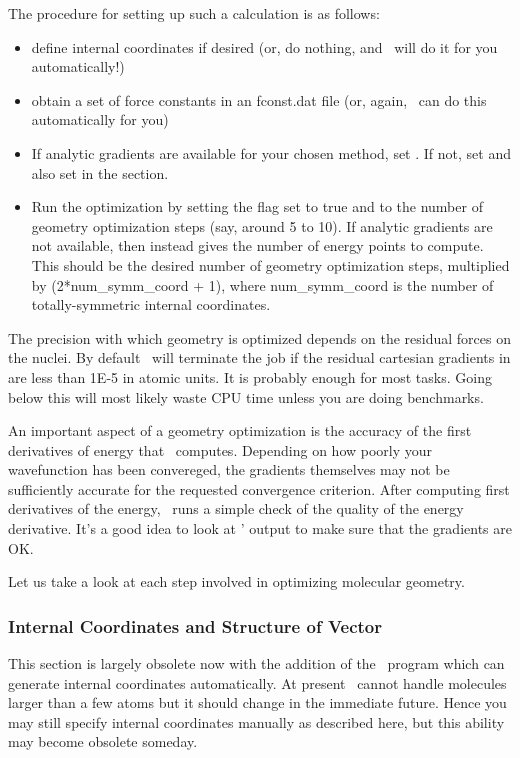 The procedure for setting up such a calculation is as follows: 
\begin{itemize}
\item define internal coordinates if desired (or, do nothing, and
      \PSIoptking\ will do it for you automatically!)
\item obtain a set of force constants in an fconst.dat file (or,
      again, \PSIoptking\ can do this automatically for you)
\item If analytic gradients are available for your chosen method, set
      .  If not, set  and
      also set  in the
       section.
\item Run the optimization by setting the  flag set to true 
      and  to the number of geometry optimization
      steps (say, around 5 to 10).  If analytic gradients are not
      available, then  instead gives the number of energy
      points to compute.  This should be the desired number of 
      geometry optimization steps, multiplied by (2*num\_symm\_coord + 1),
      where num\_symm\_coord is the number of totally-symmetric internal
      coordinates.
\end{itemize}
The precision with which geometry is optimized depends on the residual
forces on the nuclei. By default \PSIoptking\ will terminate the job
if the residual cartesian gradients in  are less than
1E-5 in atomic units. It is probably enough for most
tasks. Going below this will most likely waste CPU
time unless you are doing benchmarks.

An important aspect of a geometry optimization is the accuracy of the
first derivatives of energy that \PSIthree\ computes.  Depending on
how poorly your wavefunction has been convereged, the gradients
themselves may not be sufficiently accurate for the requested
convergence criterion. After computing first derivatives of the
energy, \PSIcints\ runs a simple check of the quality of the energy
derivative. It's a good idea to look at \PSIcints ' output to make
sure that the gradients are OK.

Let us take a look at each step involved in optimizing molecular geometry.

\subsubsection{Internal Coordinates and Structure of  Vector}
This section is largely obsolete now with the addition of the \PSIoptking\ 
program which can generate internal coordinates automatically. At present
\PSIoptking\ cannot handle molecules larger than a few
atoms but it should change in the immediate future. Hence 
you may still specify internal coordinates manually
as described here, but this ability may become obsolete someday.

